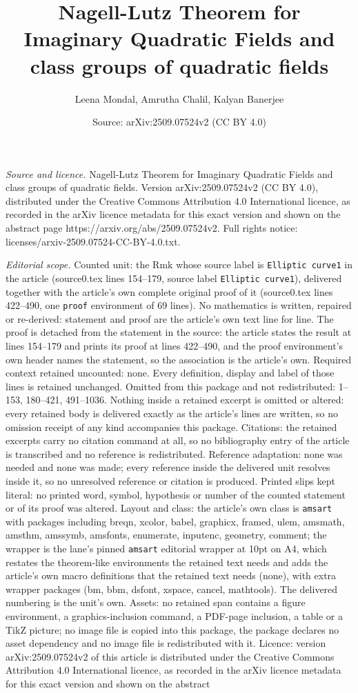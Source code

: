 \documentclass[10pt,a4paper]{amsart}
\title[Nagell-Lutz Theorem for Imaginary Quadratic Fields and class]{Nagell-Lutz Theorem for Imaginary Quadratic Fields and class groups of quadratic fields}
\author{Leena Mondal, Amrutha Chalil, Kalyan Banerjee}
\date{Source: arXiv:2509.07524v2 (CC BY 4.0)}
\begin{document}
\maketitle

\noindent\emph{Source and licence.} Nagell-Lutz Theorem for Imaginary Quadratic Fields and class groups of quadratic fields. Version arXiv:2509.07524v2 (CC BY 4.0), distributed under the Creative Commons Attribution 4.0 International licence, as recorded in the arXiv licence metadata for this exact version and shown on the abstract page https://arxiv.org/abs/2509.07524v2. Full rights notice: licenses/arxiv-2509.07524-CC-BY-4.0.txt.\par\smallskip

\noindent\textit{Editorial scope.} Counted unit: the Rmk whose source label is \texttt{Elliptic curve1} in the article (source0.tex lines 154--179, source label \texttt{Elliptic curve1}), delivered together with the article's own complete original proof of it (source0.tex lines 422--490, one \texttt{proof} environment of 69 lines). No mathematics is written, repaired or re-derived: statement and proof are the article's own text line for line. The proof is detached from the statement in the source: the article states the result at lines 154--179 and prints its proof at lines 422--490, and the proof environment's own header names the statement, so the association is the article's own. Required context retained uncounted: none. Every definition, display and label of those lines is retained unchanged. Omitted from this package and not redistributed: 1--153, 180--421, 491--1036. Nothing inside a retained excerpt is omitted or altered: every retained body is delivered exactly as the article's lines are written, so no omission receipt of any kind accompanies this package. Citations: the retained excerpts carry no citation command at all, so no bibliography entry of the article is transcribed and no reference is redistributed. Reference adaptation: none was needed and none was made; every reference inside the delivered unit resolves inside it, so no unresolved reference or citation is produced. Printed slips kept literal: no printed word, symbol, hypothesis or number of the counted statement or of its proof was altered. Layout and class: the article's own class is \texttt{amsart} with packages including breqn, xcolor, babel, graphicx, framed, ulem, amsmath, amsthm, amssymb, amsfonts, enumerate, inputenc, geometry, comment; the wrapper is the lane's pinned \texttt{amsart} editorial wrapper at 10pt on A4, which restates the theorem-like environments the retained text needs and adds the article's own macro definitions that the retained text needs (none), with extra wrapper packages (bm, bbm, dsfont, xspace, cancel, mathtools). The delivered numbering is the unit's own. Assets: no retained span contains a figure environment, a graphics-inclusion command, a PDF-page inclusion, a table or a TikZ picture; no image file is copied into this package, the package declares no asset dependency and no image file is redistributed with it. Licence: version arXiv:2509.07524v2 of this article is distributed under the Creative Commons Attribution 4.0 International licence, as recorded in the arXiv licence metadata for this exact version and shown on the abstract 
\end{document}

